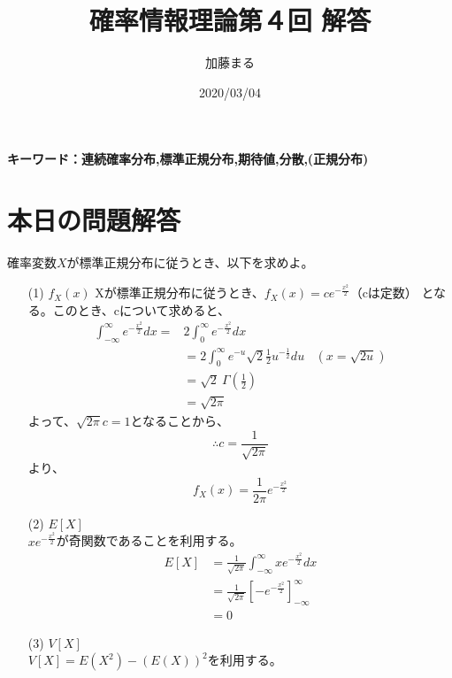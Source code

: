 \documentclass[a4j,uplatex,dvipdfmx]{jsarticle}
\title{確率情報理論第４回 解答}
\author{加藤まる}
\date{2020/03/04}
\begin{document}
\maketitle
\bf キーワード：連続確率分布,標準正規分布,期待値,分散,(正規分布)
\rm

\section*{本日の問題解答}
確率変数$X$が標準正規分布に従うとき、以下を求めよ。
\begin{itemize}
  \item[(1)] $f_X(x)$
   Xが標準正規分布に従うとき、$f_X(x)=ce^{-\frac{x^2}{2}}$（cは定数）
   となる。このとき、cについて求めると、
   \begin{equation}
     \begin{split}
       \int_{-\infty}^{\infty} e^{-\frac{x^2}{2}} dx =& 2 \int_{0}^{\infty} e^{-\frac{x^2}{2}} dx \\
        &= 2 \int_{0}^{\infty} e^{-u}\sqrt{2}\frac{1}{2} u^{-\frac{1}{2}}du \ \ \ \  (x=\sqrt{2u}) \\
        &= \sqrt{2} \  \Gamma \left( \frac{1}{2} \right) \\
        &= \sqrt{2\pi}
     \end{split}
   \end{equation}
   よって、$\sqrt{2\pi} c =1$となることから、 \\
   \begin{equation}
   \therefore c=\frac{1}{\sqrt{2\pi}}
   \end{equation}
  より、
   \begin{equation}
    f_X(x)=\frac{1}{2\pi} e^{-\frac{x^2}{2}}
   \end{equation}
  \item[(2)] $E[X]$ \\
  $\displaystyle xe^{-\frac{x^2}{2}}$が奇関数であることを利用する。
  \begin{equation}
    \begin{split}
      E[X]&= \frac{1}{\sqrt{2\pi}} \int_{-\infty}^{\infty}xe^{-\frac{x^2}{2}}dx \\
      &= \frac{1}{\sqrt{2\pi}} \left[ -e^{-\frac{x^2}{2}} \right]_{-\infty}^{\infty} \\
      &= 0
    \end{split}
  \end{equation} 
  \item[(3)] $V[X]$  \\
  $V[X]=E(X^2)-(E(X))^2$を利用する。 

\end{itemize}
\end{document}
